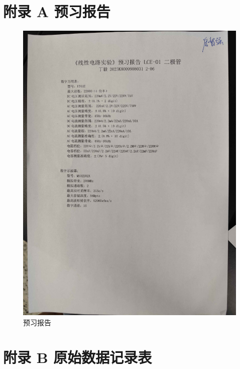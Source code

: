 \documentclass[UTF8]{article}
\begin{document}
\newpage
\section*{附录 A\hspace*{20pt} 预习报告}
\thispagestyle{fancy} 
\begin{figure}[H]\centering
    \includegraphics[width=\columnwidth]{LCE-01-二极管/assets/预习报告.jpg}
    \caption{预习报告}
\end{figure}

\section*{附录 B\hspace*{20pt} 原始数据记录表}
\thispagestyle{fancy} 
\end{document}

